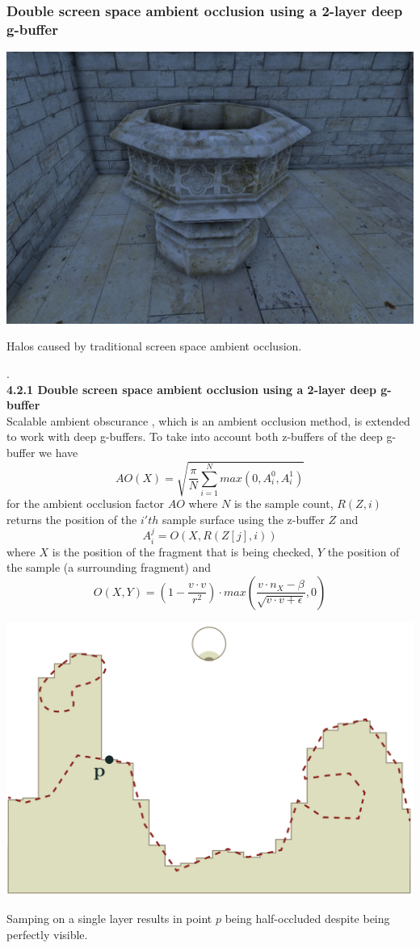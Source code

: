 \documentclass{ACGSeminar}
\begin{document}
	\subsubsection{Double screen space ambient occlusion using a 2-layer deep g-buffer}
		\begin{floatingfigure}[r]{.5\textwidth}%
			\includegraphics[width=.5\textwidth]{img/screen_space_ambient_occlusion_halo.png}
			\caption{Halos caused by traditional screen space ambient occlusion.}%
			\label{fig:halos}%
		\end{floatingfigure}%
		.\\
		\textbf{4.2.1 \quad Double screen space ambient occlusion using a 2-layer deep g-buffer} \\Scalable ambient obscurance \cite{SAO}, which is an ambient occlusion method, is extended to work with deep g-buffers. To take into account both z-buffers of the deep g-buffer we have%
		$$ AO(X) = \sqrt{\frac{\pi}{N} \sum_{i=1}^{N} max(0, A_{i}^{0}, A_{i}^{1})} $$
		for the ambient occlusion factor $AO$ where $N$ is the sample count, $R(Z, i)$ returns the position of the $i'th$ sample surface using the z-buffer $Z$ and
		$$ A_{i}^{j} = O(X, R(Z[j], i))$$
		where $X$ is the position of the fragment that is being checked, $Y$ the position of the sample (a surrounding fragment) and
		$$ O(X, Y) = (1 - \frac{v \cdot v}{r^2}) \cdot max(\frac{v \cdot n_X - \beta}{\sqrt{v \cdot v + \epsilon}}, 0) $$
		\begin{floatingfigure}[r]{.5\textwidth}%
			\includegraphics[width=.5\textwidth]{img/ambient_occlusion_depth_discontinuity.png}
			\caption{Samping on a single layer results in point $p$ being half-occluded despite being perfectly visible.}%
			\label{fig:depth_discontinuity}%
		\end{floatingfigure}%
\end{document}
